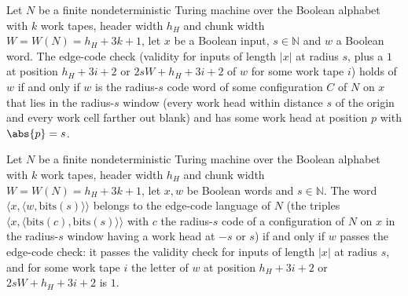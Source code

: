 \begin{theorem}
\label{Complexity.Codec.edgeChk_iff}
\leanok
{}
Let $N$ be a finite nondeterministic Turing machine over the Boolean alphabet with $k$ work tapes, header width $h_H$ and chunk width $W=W(N)=h_H+3k+1$,
let $x$ be a Boolean input, $s\in\mathbb N$ and $w$ a Boolean word. The edge-code check
(validity for inputs of length $|x|$ at radius $s$, plus a $1$ at position $h_H+3i+2$ or
$2sW+h_H+3i+2$ of $w$ for some work tape $i$) holds of $w$ if and only if $w$ is the radius-$s$
code word of some configuration $C$ of $N$ on $x$ that lies in the radius-$s$ window (every work
head within distance $s$ of the origin and every work cell farther out blank) and has some work
head at position $p$ with $\abs{p}=s$.
\end{theorem}

\begin{theorem}
\label{Complexity.Codec.edgeLang_iff}
\leanok
{}
Let $N$ be a finite nondeterministic Turing machine over the Boolean alphabet with $k$ work tapes, header width $h_H$ and chunk width $W=W(N)=h_H+3k+1$,
let $x,w$ be Boolean words and $s\in\mathbb N$. The word
$\langle x,\langle w,\mathrm{bits}(s)\rangle\rangle$ belongs to the edge-code language of $N$
(the triples $\langle x,\langle\mathrm{bits}(c),\mathrm{bits}(s)\rangle\rangle$ with $c$ the
radius-$s$ code of a configuration of $N$ on $x$ in the radius-$s$ window having a work head at
$-s$ or $s$) if and only if $w$ passes the edge-code check: it passes the validity check for
inputs of length $|x|$ at radius $s$, and for some work tape $i$ the letter of $w$ at position
$h_H+3i+2$ or $2sW+h_H+3i+2$ is $1$.
\end{theorem}
